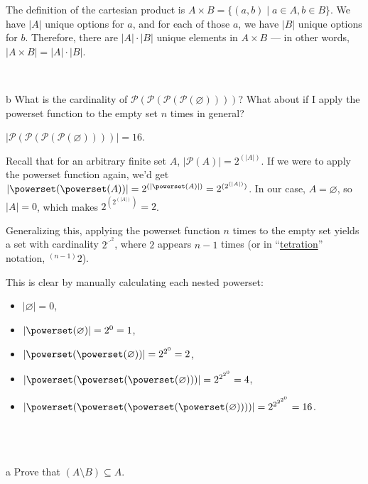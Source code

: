 \documentclass{article}
\begin{document}
The definition of the cartesian product is $A \times B = \{ (a,b) \mid a \in A, b \in B \}$. We have $|A|$ unique options for $a$, and for each of those $a$, we have $|B|$ unique options for $b$. Therefore, there are $|A| \cdot |B|$ unique elements in $A \times B$ — in other words, $|A \times B| = |A| \cdot |B|$.

\

\begin{problem} b
What is the cardinality of $\mathcal{P}(\mathcal{P}(\mathcal{P}(\mathcal{P}(\varnothing))))$? What about if I apply the powerset function to the empty set $n$ times in general?
\end{problem}

$|\mathcal{P}(\mathcal{P}(\mathcal{P}(\mathcal{P}(\varnothing))))| = 16$.

Recall that for an arbitrary finite set $A$, $|\mathcal{P}(A)| = 2^{(|A|)}$. If we were to apply the powerset function again, we'd get $| \powerset ( \powerset (A) ) | = 2^{(| \powerset (A) |)} = 2^{(2^{(|A|)})}$. In our case, $A = \varnothing$, so $|A|=0$, which makes $2^{(2^{(|A|)})}=2$.


Generalizing this, applying the powerset function $n$ times to the empty set yields a set with cardinality $2^{\iddots ^ 2}$, where $2$ appears $n-1$ times (or in ``\href{https://en.wikipedia.org/wiki/Tetration}{tetration}'' notation, $^{(n-1)} 2$).

This is clear by manually calculating each nested powerset:

\begin{itemize}
    \item $|\varnothing| = 0$,
    \item $|\powerset (\varnothing)| = 2^0 = 1$,
    \item $|\powerset ( \powerset ( \varnothing) )| = 2^{2^0} = 2$,
    \item $|\powerset ( \powerset ( \powerset ( \varnothing) ) )| = 2^{2^{2^0}} = 4$,
    \item $|\powerset ( \powerset ( \powerset ( \powerset ( \varnothing) ) ) )| = 2^{2^{2^{2^0}}} = 16$.
\end{itemize}

\
\hline
\section{}

\begin{problem} a
Prove that $(A \setminus B) \subseteq A$.
\end{problem}
\end{document}
